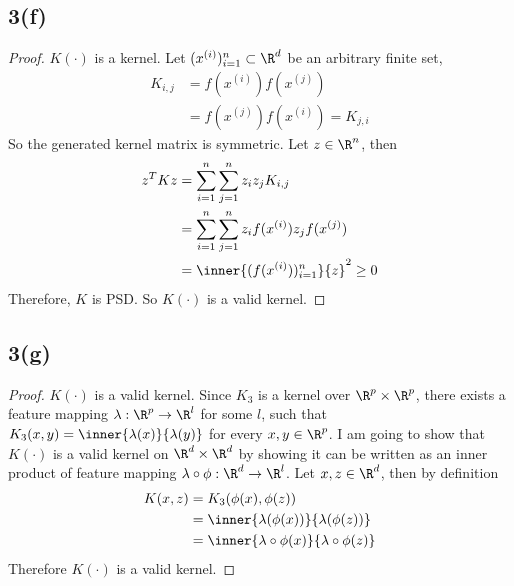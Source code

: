 \documentclass[11pt]{article}
\newcommand{\upi}[0]{^{(i)}}
\newcommand{\upj}[0]{^{(j)}}
\begin{document}
	\newpage
	\subsection{3(f)}
	\begin{proof}
		$K(\cdot)$ is a kernel. Let $(x\upi)_{i=1}^n \subset \R^d$ be an arbitrary finite set, 
		\begin{align}
			K_{i, j} &= f(x\upi) f(x\upj) \\
			&= f(x\upj)f(x\upi) = K_{j, i}
		\end{align}
		So the generated kernel matrix is symmetric. Let $z \in \R^n$, then
		\begin{align}
			z^T K z &= \sum_{i=1}^n \sum_{j=1}^n z_i z_j K_{i, j} \\
			&= \sum_{i=1}^n \sum_{j=1}^n z_i f(x\upi) z_j f(x\upj) \\
			&= \inner{(f(x\upi))_{i=1}^n}{z}^2 \geq 0
		\end{align}
		Therefore, $K$ is PSD. So $K(\cdot)$ is a valid kernel.
	\end{proof}
	
	\newpage
	\subsection{3(g)}
	\begin{proof}
		$K(\cdot)$ is a valid kernel. Since $K_3$ is a kernel over $\R^p \times \R^p$, there exists a feature mapping $\lambda: \R^p \to \R^l$ for some $l$, such that $K_3(x, y) = \inner{\lambda(x)}{\lambda(y)}$ for every $x, y \in \R^p$. I am going to show that $K(\cdot)$ is a valid kernel on $\R^d \times \R^d$ by showing it can be written as an inner product of feature mapping $\lambda \circ \phi: \R^d \to \R^l$. Let $x, z \in \R^d$, then by definition
		\begin{align}
			K(x, z) &= K_3(\phi(x), \phi(z)) \\
			&= \inner{\lambda(\phi(x))}{\lambda(\phi(z))} \\
			&= \inner{\lambda \circ \phi(x)}{\lambda \circ \phi(z)}
		\end{align}
		Therefore $K(\cdot)$ is a valid kernel.
	\end{proof}
	
	\newpage
\end{document}
